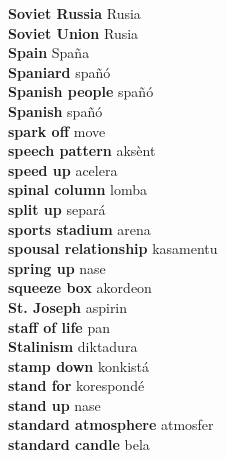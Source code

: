 \textbf{ Soviet Russia  } Rusia \\
\textbf{ Soviet Union  } Rusia \\
\textbf{ Spain  } Spaña \\
\textbf{ Spaniard  } spañó \\
\textbf{ Spanish people  } spañó \\
\textbf{ Spanish  } spañó \\
\textbf{ spark off  } move \\
\textbf{ speech pattern  } aksènt \\
\textbf{ speed up  } acelera \\
\textbf{ spinal column  } lomba \\
\textbf{ split up  } separá \\
\textbf{ sports stadium  } arena \\
\textbf{ spousal relationship  } kasamentu \\
\textbf{ spring up  } nase \\
\textbf{ squeeze box  } akordeon \\
\textbf{ St. Joseph  } aspirin \\
\textbf{ staff of life  } pan \\
\textbf{ Stalinism  } diktadura \\
\textbf{ stamp down  } konkistá \\
\textbf{ stand for  } korespondé \\
\textbf{ stand up  } nase \\
\textbf{ standard atmosphere  } atmosfer \\
\textbf{ standard candle  } bela \\
